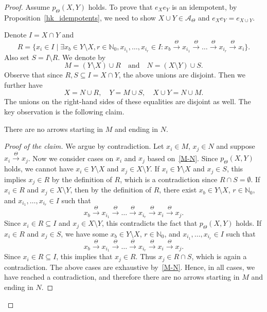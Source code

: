 \documentclass[10pt,a4paper]{amsart}
\newcommand{\tot}{\overset{\Theta}{\to}}
\begin{document}
\begin{proof}
   Assume $p_{\Theta}(X, Y)$ holds.
   To prove that $e_X e_Y$ is an idempotent, by Proposition~\ref{hk_idempotents}, we need to show $X \cup Y \in \mathcal{A}_{\Theta}$ and $e_X e_Y = e_{X \cup Y}$.
   
   Denote $I = X \cap Y$ and
   \[
   R = \{x_i \in I \mid \exists x_b \in Y \setminus X, r \in \mathbb{N}_0,
   x_{i_1}, \dots, x_{i_r} \in I
   : x_b \tot x_{i_1} \tot \dots \tot x_{i_r} \tot x_i\}.
   \]
   Also set $S = I \setminus R$.
   We denote by
   \begin{equation}\label{M-N}
      M = (Y \setminus X) \cup R \quad \text{and} \quad N = (X \setminus Y) \cup S. 
   \end{equation}
   Observe that since $R, S \subseteq I = X \cap Y$, the above unions are disjoint.
   Then we further have 
   \begin{equation}\label{xy_decomp}
      X = N \cup R, \quad Y = M \cup S, \quad X \cup Y = N \cup M.
   \end{equation}
   The unions on the right-hand sides of these equalities are disjoint as well.
   The key observation is the following claim.
   \begin{claim}
      There are no arrows starting in $M$ and ending in $N$.
   \end{claim}

   \begin{proof}[Proof of the claim]
      We argue by contradiction.
      Let $x_i \in M$, $x_j \in N$ and suppose $x_i \tot x_j$.
      Now we consider cases on $x_i$ and $x_j$ based on~\eqref{M-N}.
      Since $p_{\Theta}(X, Y)$ holds, we cannot have $x_i \in Y \setminus X$ and $x_j \in X \setminus Y$.
      If $x_i \in Y \setminus X$ and $x_j \in S$, this implies $x_j \in R$ by the definition of $R$, which is a contradiction since $R \cap S = \emptyset$.
      If $x_i \in R$ and $x_j \in X \setminus Y$, then by the definition of $R$, there exist $x_b \in Y \setminus X$, $r \in \mathbb{N}_0$, and $x_{i_1}, \dots, x_{i_r} \in I$ such that
      \[
      x_b \tot x_{i_1} \tot \dots \tot x_{i_r} \tot x_i \tot x_j.
      \]
      Since $x_i \in R \subseteq I$ and $x_j \in X \setminus Y$, this contradicts the fact that $p_{\Theta}(X, Y)$ holds.
      If $x_i \in R$ and $x_j \in S$, we have some $x_b \in Y \setminus X$, $r \in \mathbb{N}_0$, and $x_{i_1}, \dots, x_{i_r} \in I$ such that 
      \[
      x_b \tot x_{i_1} \tot \dots \tot x_{i_r} \tot x_i \tot x_j.
      \]
      Since $x_i \in R \subseteq I$, this implies that $x_j \in R$.
      Thus $x_j \in R \cap S$, which is again a contradiction.
      The above cases are exhaustive by~\eqref{M-N}.
      Hence, in all cases, we have reached a contradiction, and therefore there are no arrows starting in $M$ and ending in $N$. 
   \end{proof}


\end{proof}
\end{document}

